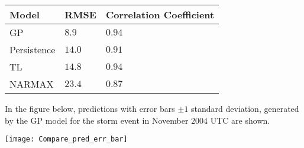 \documentclass[landscape,a0b,final]{a0poster}
\newenvironment{poster}{
  \begin{center}
  \begin{minipage}[c]{0.85\textwidth}
}{
  \end{minipage} 
  \end{center}
}
\begin{document}
\begin{poster}
\begin{multicols}{3}
\vspace{\baselineskip}
\setlength{\arrayrulewidth}{1mm}
\setlength{\tabcolsep}{18pt}
\renewcommand{\arraystretch}{2.5}
\begin{tabular}{ |p{10cm}|p{10cm}|p{10cm}|  }
\hline
Model & RMSE & Correlation Coefficient\\
\hline
GP  & $8.9$ & $0.94$ \\
Persistence  & $14.0$ & $0.91$ \\
TL & $14.8$ & $0.94$ \\
NARMAX & $23.4$ & $0.87$ \\
\hline
\end{tabular} 


\vspace{\baselineskip}
In the figure below, predictions with error bars $\pm 1$ standard deviation, generated by the GP model for the storm event in November $2004$ UTC are shown.
\vspace{\baselineskip}

\texttt{[image: Compare\_pred\_err\_bar]} \label{fig:plots}

\vspace{\baselineskip}


\end{multicols}

\end{poster}
\end{document}
